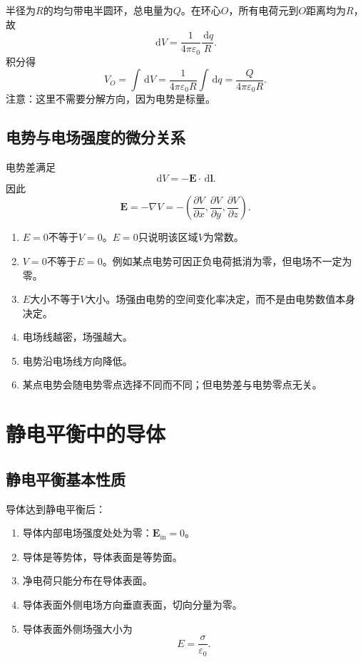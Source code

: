 \documentclass[UTF8,zihao=-4]{ctexart}
\newcommand{\dd}{\,\mathrm d}
\newcommand{\epsz}{\varepsilon_0}
\newcommand{\ve}[1]{\bm{#1}}
\newcommand{\E}{\ve E}
\newcommand{\dl}{\dd\ve l}
\newcommand{\grad}{\nabla}
\begin{document}
半径为\(R\)的均匀带电半圆环，总电量为\(Q\)。在环心\(O\)，所有电荷元到\(O\)距离均为\(R\)，故
\[
\dd V=\frac{1}{4\pi\epsz}\frac{\dd q}{R}.
\]
积分得
\begin{equation}
V_O=\int \dd V=\frac{1}{4\pi\epsz R}\int\dd q
=\boxed{\frac{Q}{4\pi\epsz R}}.
\end{equation}
注意：这里不需要分解方向，因为电势是标量。

\subsection{电势与电场强度的微分关系}

电势差满足
\begin{equation}
\dd V=-\E\cdot\dl.
\end{equation}
因此
\begin{equation}
\boxed{\E=-\grad V=-\left(\frac{\partial V}{\partial x},\frac{\partial V}{\partial y},\frac{\partial V}{\partial z}\right)}.
\end{equation}

\begin{warnbox}[电势易错点]
\begin{enumerate}
  \item \(E=0\)不等于\(V=0\)。\(E=0\)只说明该区域\(V\)为常数。
  \item \(V=0\)不等于\(E=0\)。例如某点电势可因正负电荷抵消为零，但电场不一定为零。
  \item \(E\)大小不等于\(V\)大小。场强由电势的空间变化率决定，而不是由电势数值本身决定。
  \item 电场线越密，场强越大。
  \item 电势沿电场线方向降低。
  \item 某点电势会随电势零点选择不同而不同；但电势差与电势零点无关。
\end{enumerate}
\end{warnbox}

\section{静电平衡中的导体}

\subsection{静电平衡基本性质}

导体达到静电平衡后：
\begin{enumerate}
  \item 导体内部电场强度处处为零：\(\E_{\mathrm{in}}=0\)。
  \item 导体是等势体，导体表面是等势面。
  \item 净电荷只能分布在导体表面。
  \item 导体表面外侧电场方向垂直表面，切向分量为零。
  \item 导体表面外侧场强大小为
  \[
  E=\frac{\sigma}{\epsz}.
  \]
\end{enumerate}
\end{document}
